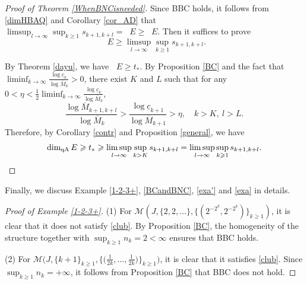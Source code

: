 \documentclass[12pt]{amsart}
\numberwithin{equation}{section}
\theoremstyle{plain}
\theoremstyle{remark}
\theoremstyle{definition}
\newcommand{\om}{\overline{M}}
\newcommand{\f}{\frac}
\newcommand{\uc}{\underline{c}}
\renewcommand{\ge}{\geqslant}
\renewcommand{\geq}{\geqslant}
\DeclareMathOperator{\dima}{dim_A}
\DeclareMathOperator{\dimqa}{dim_{qA}}
\begin{document}
	\begin{proof}[Proof of Theorem \ref{WhenBNCisneeded}]
		Since BBC holds, it follows from \eqref{dimHBAQ}  and Corollary \ref{cor_AD} that $\limsup_{l\to\infty}\sup_{k\ge 1} s_{k+1,k+l}=	\dima E\geq \dimqa E$.
		Then it suffices to prove
		\[
		\dimqa E\ge\limsup_{l\to\infty}\sup_{k\ge 1} s_{k+1,k+l}.
		\]
		
		By Theorem \ref{dayu}, we have $\dimqa E\ge t_*$.  
		By Proposition \ref{BC} and the fact that $\liminf_{k\to\infty}\f{\log \uc_k}{\log \om_k}>0$, there exist $K$ and $L$ such that for any $0<\eta<\frac12\liminf_{k\to\infty}\f{\log \uc_k}{\log \om_k}$,
		\[
		\f{\log \om_{k+1,k+l}}{\log \om_{k}}> \f{\log \uc_{k+1}}{\log \om_{k+1}}>\eta,\quad k>K,\ l>L.
		\]
		Therefore, by Corollary \ref{contr} and Proposition \ref{general}, we have
		\begin{equation*}
			\begin{aligned}
				\dimqa E\ge t_*\ge\limsup_{l\to\infty}\sup_{k>K}s_{k+1,k+l}=\limsup_{l\to\infty}\sup_{k\ge 1} s_{k+1,k+l}.
			\end{aligned}\qedhere
		\end{equation*}
		
		
		
	\end{proof}
	
	
	Finally, we discuss Example  \ref{1-2-3+}, \ref{BCandBNC},   \ref{exa'} and   \ref{exa} in details.
	\begin{proof}[Proof of Example \ref{1-2-3+}]
			(1) For $\mathcal{M} (J,\{2,2,\dots\}, \{ (2^{-2^k},2^{-2^k} ) \}_{k\ge 1} )$, it is clear that  it does not satisfy \eqref{club}. By Proposition \ref{BC}, the homogeneity of the structure together with $\sup_{k\ge 1} n_k=2<\infty$ ensures that BBC holds.
			
			(2) For $ \mathcal{M}\big(J,\{k+1\}_{k\ge 1},\big\{\big(\f1{2k},\ldots,\f1{2k}\big)\big\}_{k\ge 1}\big)$, it is clear that  it  satisfies \eqref{club}. Since $\sup_{k\ge 1} n_k=+\infty$, it follows from Proposition \ref{BC} that   BBC does not hold.
	\end{proof}
	
\end{document}
